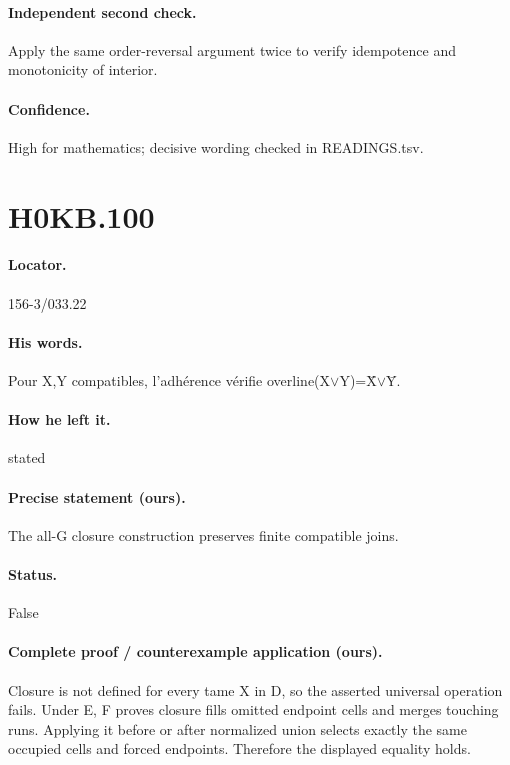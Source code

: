 \paragraph{Independent second check.} Apply the same order-reversal argument twice to verify idempotence and monotonicity of interior.

\paragraph{Confidence.} High for mathematics; decisive wording checked in READINGS.tsv.

\section*{H0KB.100}\label{statement:H0KB.100}
\paragraph{Locator.} 156-3/033.22

\paragraph{His words.} Pour X,Y compatibles, l’adhérence vérifie overline(X\ensuremath{\vee}Y)=X̄\ensuremath{\vee}Ȳ.

\paragraph{How he left it.} stated

\paragraph{Precise statement (ours).} The all-G closure construction preserves finite compatible joins.

\paragraph{Status.} False

\paragraph{Complete proof / counterexample application (ours).} Closure is not defined for every tame X in D, so the asserted universal operation fails. Under E, F proves closure fills omitted endpoint cells and merges touching runs. Applying it before or after normalized union selects exactly the same occupied cells and forced endpoints. Therefore the displayed equality holds.

